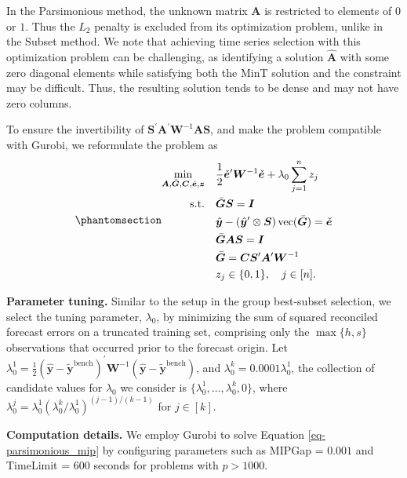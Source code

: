 \documentclass[
  11pt]{article}
\theoremstyle{plain}
\theoremstyle{remark}
\begin{document}
In the Parsimonious method, the unknown matrix \(\bm{A}\) is restricted
to elements of \(0\) or \(1\). Thus the \(L_2\) penalty is excluded from
its optimization problem, unlike in the Subset method. We note that
achieving time series selection with this optimization problem can be
challenging, as identifying a solution \(\hat{\bm{A}}\) with some zero
diagonal elements while satisfying both the MinT solution and the
constraint may be difficult. Thus, the resulting solution tends to be
dense and may not have zero columns.

To ensure the invertibility of
\(\bm{S}^{\prime}\bm{A}^{\prime}\bm{W}^{-1}\bm{A}\bm{S}\), and make the
problem compatible with Gurobi, we reformulate the problem as
\begin{equation}\phantomsection\label{eq-parsimonious_mip}{
\begin{aligned}
\min_{\bm{A},\bar{\bm{G}},\bm{C},\check{\bm{e}},\bm{z}} \quad & \frac{1}{2}\check{\bm{e}}^{\prime} \bm{W}^{-1}\check{\bm{e}} + \lambda_0 \sum_{j=1}^n z_j \\
\text{s.t.} \quad & \bar{\bm{G}}\bm{S} = \bm{I} \\
& \hat{\bm{y}}-\left(\hat{\bm{y}}^{\prime} \otimes \bm{S}\right)\operatorname{vec}(\bar{\bm{G}}) = \check{\bm{e}} \\
& \bar{\bm{G}}\bm{A}\bm{S} = \bm{I} \\
& \bar{\bm{G}} = \bm{C}\bm{S}^{\prime}\bm{A}^{\prime}\bm{W}^{-1} \\
& z_j \in\{0,1\}, \quad j \in[n].
\end{aligned}
}\end{equation}

\textbf{Parameter tuning.} Similar to the setup in the group best-subset
selection, we select the tuning parameter, \(\lambda_0\), by minimizing
the sum of squared reconciled forecast errors on a truncated training
set, comprising only the \(\max\{h, s\}\) observations that occurred
prior to the forecast origin. Let
\(\lambda_{0}^{1} = \frac{1}{2}\left(\hat{\bm{y}}-\tilde{\bm{y}}^{\text{bench}}\right)^{\prime} \bm{W}^{-1}\left(\hat{\bm{y}}-\tilde{\bm{y}}^{\text{bench}}\right)\),
and \(\lambda_{0}^{k} = 0.0001\lambda_{0}^{1}\), the collection of
candidate values for \(\lambda_0\) we consider is
\(\{\lambda_{0}^{1},\dots,\lambda_{0}^{k}, 0\}\), where
\(\lambda_{0}^{j} = \lambda_{0}^{1}\left(\lambda_{0}^{k} / \lambda_{0}^{1}\right)^{(j-1) / (k-1)}\)
for \(j \in [k]\).

\textbf{Computation details.} We employ Gurobi to solve Equation
\eqref{eq-parsimonious_mip} by configuring parameters such as MIPGap =
\(0.001\) and TimeLimit = \(600\) seconds for problems with
\(p > 1000\).
\end{document}
